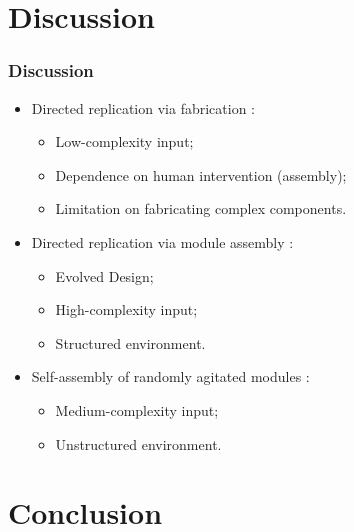 \documentclass[14pt]{beamer}
\theoremstyle{remark}
\begin{document}
\section{Discussion}
\begin{frame}
  \frametitle{Discussion}
  \begin{itemize}
  	 \item Directed replication via fabrication :
  	 \begin{itemize}
  	   \item Low-complexity input;
  	   \item Dependence on human intervention (assembly);
  	   \item Limitation on fabricating complex components.
  	 \end{itemize}
  	 \item Directed replication via module assembly :
  	 \begin{itemize}
  	   \item Evolved Design;
      \item High-complexity input;
      \item Structured environment.
  	 \end{itemize}
  	 \item Self-assembly of randomly agitated modules :
  	 \begin{itemize}
  	   \item Medium-complexity input;
  	   \item Unstructured environment.
  	 \end{itemize}
	\end{itemize}
\end{frame}

\section{Conclusion}

\end{document}
